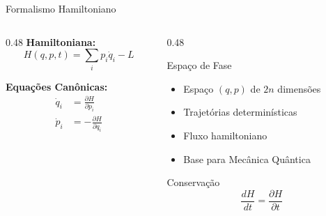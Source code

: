 \documentclass[aspectratio=169,12pt]{beamer}
\begin{document}
\begin{frame}{Formalismo Hamiltoniano}
    \begin{columns}[T]
        \begin{column}{0.48\textwidth}
            \textbf{Hamiltoniana:}
            \begin{equation*}
                H(q, p, t) = \sum_i p_i \dot{q}_i - L
            \end{equation*}

            \textbf{Equações Canônicas:}
            \begin{align*}
                \dot{q}_i &= \frac{\partial H}{\partial p_i} \\[0.3cm]
                \dot{p}_i &= -\frac{\partial H}{\partial q_i}
            \end{align*}
        \end{column}
        \begin{column}{0.48\textwidth}
            \begin{block}{Espaço de Fase}
                \begin{itemize}
                    \item Espaço $(q, p)$ de $2n$ dimensões
                    \item Trajetórias determinísticas
                    \item Fluxo hamiltoniano
                    \item Base para Mecânica Quântica
                \end{itemize}
            \end{block}

            \begin{alertblock}{Conservação}
                \begin{equation*}
                    \frac{dH}{dt} = \frac{\partial H}{\partial t}
                \end{equation*}
            \end{alertblock}
        \end{column}
    \end{columns}
\end{frame}
\end{document}
